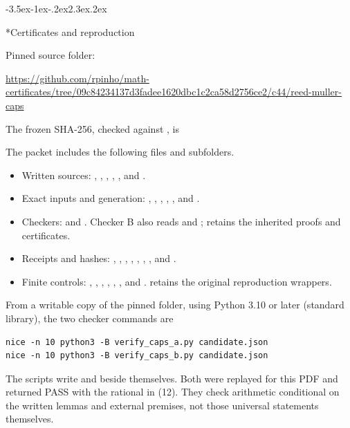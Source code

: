 \documentclass[11pt]{article}
\makeatletter
\renewcommand\section{\@startsection{section}{1}{\z@}
  {-3.5ex\@plus -1ex\@minus -.2ex}{2.3ex\@plus .2ex}
  {\normalfont\Large\bfseries\raggedright}}
\theoremstyle{remark}
\theoremstyle{correctionstyle}
\makeatother
\begin{document}
\section*{Certificates and reproduction}
\label{certificates}
Pinned source folder:
\begin{center}\small
\url{https://github.com/rpinho/math-certificates/tree/09c84234137d3fadee1620dbc1c2ca58d2756ce2/c44/reed-muller-caps}
\end{center}
The frozen  SHA-256, checked against , is
\begin{center}\small{}\end{center}
The packet includes the following files and subfolders.
\begin{itemize}
\item Written sources: , ,
, , , and .
\item Exact inputs and generation: , ,
, , , and .
\item Checkers:  and .
Checker B also reads  and
;  retains
the inherited proofs and certificates.
\item Receipts and hashes: , ,
, ,
, , ,
and .
\item Finite controls: , ,
, ,
, , and .
 retains the original reproduction wrappers.
\end{itemize}
From a writable copy of the pinned folder, using Python 3.10 or later
(standard library), the two checker commands are
\begin{verbatim}
nice -n 10 python3 -B verify_caps_a.py candidate.json
nice -n 10 python3 -B verify_caps_b.py candidate.json
\end{verbatim}
The scripts write  and 
beside themselves. Both were replayed for this PDF and returned PASS with
the rational in (12). They check arithmetic conditional on the written
lemmas and external premises, not those universal statements themselves.
\end{document}
